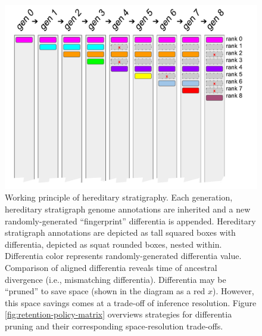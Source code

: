 \begin{figure}
  \centering
  \includegraphics[width=\textwidth]{img/deposit-prune-example}
  \caption{
    Working principle of hereditary stratigraphy.
    Each generation, hereditary stratigraph genome annotations are inherited and a new randomly-generated ``fingerprint'' differentia is appended.
    Hereditary stratigraph annotations are depicted as tall squared boxes with differentia, depicted as squat rounded boxes, nested within.
    Differentia color represents randomly-generated differentia value.
    Comparison of aligned differentia reveals time of ancestral divergence (i.e., mismatching differentia).
    Differentia may be ``pruned'' to save space (shown in the diagram as a red $x$).
    However, this space savings comes at a trade-off of inference resolution.
    Figure \ref{fig:retention-policy-matrix} overviews strategies for differentia pruning and their corresponding space-resolution trade-offs.
  }
  \label{fig:deposit-prune-example}
\end{figure}
